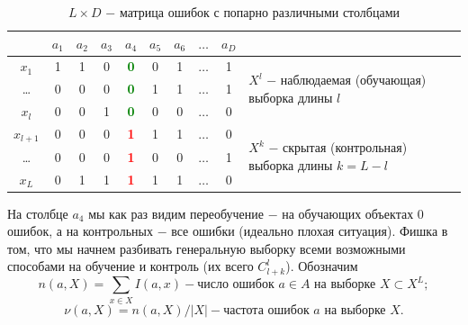 \begin{table}[hbt!]
    \begin{tabular}{c|cccccccc|p{5cm}}
                  & $a_1$ & $a_2$ & $a_3$ & $a_4$                         & $a_5$ & $a_6$ & $\dots$ & $a_D$ &                                                                                      \\
        \hline
        $x_1$     & 1     & 1     & 0     & \textcolor{green}{\textbf{0}} & 0     & 1     & $\dots$ & 1     & \multirow{3}{*}{\parbox{5cm}{$X^l$ $-$ наблюдаемая (обучающая) выборка длины $l$}}   \\
        \dots     & 0     & 0     & 0     & \textcolor{green}{\textbf{0}} & 1     & 1     & $\dots$ & 1     &                                                                                      \\
        $x_l$     & 0     & 0     & 1     & \textcolor{green}{\textbf{0}} & 0     & 0     & $\dots$ & 0     &                                                                                      \\
        \hline
        $x_{l+1}$ & 0     & 0     & 0     & \textcolor{red}{\textbf{1}}   & 1     & 1     & $\dots$ & 0     & \multirow{3}{*}{\parbox{5cm}{$X^k$ $-$ скрытая (контрольная) выборка длины $k=L-l$}} \\
        \dots     & 0     & 0     & 0     & \textcolor{red}{\textbf{1}}   & 0     & 0     & $\dots$ & 1     &                                                                                      \\
        $x_L$     & 0     & 1     & 1     & \textcolor{red}{\textbf{1}}   & 1     & 1     & $\dots$ & 0     &                                                                                      \\
    \end{tabular}
    \caption{$L \times D$ $-$ матрица ошибок с попарно различными столбцами}
\end{table}

На столбце $a_4$ мы как раз видим переобучение $-$ на обучающих объектах 0 ошибок, а на контрольных $-$ все ошибки (идеально плохая ситуация). Фишка в том, что мы начнем разбивать генеральную выборку всеми возможными способами на обучение и контроль (их всего $C_{l+k}^l$). Обозначим
\begin{equation*}
    n(a, X)= \sum_{x \in X} I(a, x) - \text{число ошибок } a \in A \text{ на выборке } X \subset X^L;
\end{equation*}
\begin{equation*}
    \nu(a, X)= n(a, X)/ | X | - \text{частота ошибок } a \text{ на выборке } X.
\end{equation*}

